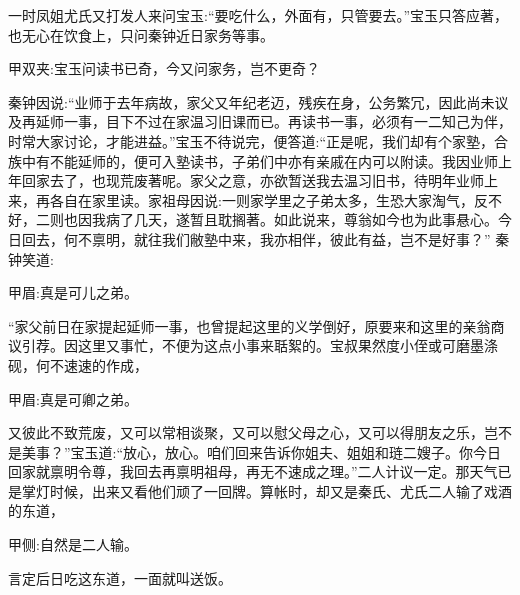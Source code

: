 \begin{parag}
    一时凤姐尤氏又打发人来问宝玉:“要吃什么，外面有，只管要去。”宝玉只答应著，也无心在饮食上，只问秦钟近日家务等事。\begin{note}甲双夹:宝玉问读书已奇，今又问家务，岂不更奇？\end{note}秦钟因说:“业师于去年病故，家父又年纪老迈，残疾在身，公务繁冗，因此尚未议及再延师一事，目下不过在家温习旧课而已。再读书一事，必须有一二知己为伴，时常大家讨论，才能进益。”宝玉不待说完，便答道:“正是呢，我们却有个家塾，合族中有不能延师的，便可入塾读书，子弟们中亦有亲戚在内可以附读。我因业师上年回家去了，也现荒废著呢。家父之意，亦欲暂送我去温习旧书，待明年业师上来，再各自在家里读。家祖母因说:一则家学里之子弟太多，生恐大家淘气，反不好，二则也因我病了几天，遂暂且耽搁著。如此说来，尊翁如今也为此事悬心。今日回去，何不禀明，就往我们敝塾中来，我亦相伴，彼此有益，岂不是好事？” 秦钟笑道:\begin{note}甲眉:真是可儿之弟。\end{note}“家父前日在家提起延师一事，也曾提起这里的义学倒好，原要来和这里的亲翁商议引荐。因这里又事忙，不便为这点小事来聒絮的。宝叔果然度小侄或可磨墨涤砚，何不速速的作成，\begin{note}甲眉:真是可卿之弟。\end{note}又彼此不致荒废，又可以常相谈聚，又可以慰父母之心，又可以得朋友之乐，岂不是美事？”宝玉道:“放心，放心。咱们回来告诉你姐夫、姐姐和琏二嫂子。你今日回家就禀明令尊，我回去再禀明祖母，再无不速成之理。”二人计议一定。那天气已是掌灯时候，出来又看他们顽了一回牌。算帐时，却又是秦氏、尤氏二人输了戏酒的东道，\begin{note}甲侧:自然是二人输。\end{note}言定后日吃这东道，一面就叫送饭。
\end{parag}


